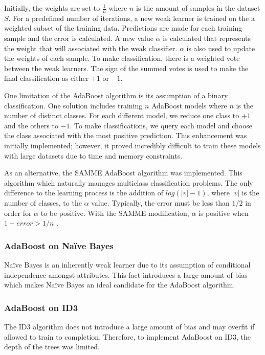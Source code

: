 \documentclass[11pt,titlepage]{article}
\begin{document}
Initially, the weights are set to $\frac{1}{n}$ where $n$ is the amount of samples in the dataset $S$. For a predefined number of iterations, a new weak learner is trained on the a weighted subset of the training data. Predictions are made for each training sample and the error is calculated. A new value $\alpha$ is calculated that represents the weight that will associated with the weak classifier. $\alpha$ is also used to update the weights of each sample. To make classification, there is a weighted vote between the weak learners. The sign of the summed votes is used to make the final classification as either $+1$ or $-1$.

One limitation of the AdaBoost algorithm is its assumption of a binary classification. One solution includes training $n$ AdaBoost models where $n$ is the number of distinct classes. For each different model, we reduce one class to $+1$ and the others to $-1$. To make classifications, we query each model and choose the class associated with the most positive prediction. This enhancement was initially implemented; however, it proved incredibly difficult to train these models with large datasets due to time and memory constraints.

As an alternative, the SAMME AdaBoost algorithm \cite{samme} was implemented. This algorithm which naturally manages multiclass classification problems. The only difference to the learning process is the addition of $log(|v|-1)$, where $|v|$ is the number of classes, to the $\alpha$ value. Typically, the error must be less than $1/2$ in order for $\alpha$ to be positive. With the SAMME modification, $\alpha$ is positive when $1-error > 1/n$ \cite{samme}.

\subsubsection{AdaBoost on Naïve Bayes}
Naïve Bayes is an inherently weak learner due to its assumption of conditional independence amongst attributes. This fact introduces a large amount of bias which makes Naïve Bayes an ideal candidate for the AdaBoost algorithm.

\subsubsection{AdaBoost on ID3}
The ID3 algorithm does not introduce a large amount of bias and may overfit if allowed to train to completion. Therefore, to implement AdaBoost on ID3, the depth of the trees was limited.
\end{document}
